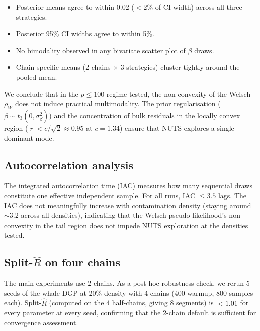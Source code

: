 \begin{itemize}
\item Posterior means agree to within $0.02$ ($< 2\%$ of CI width)
  across all three strategies.
\item Posterior 95\% CI widths agree to within 5\%.
\item No bimodality observed in any bivariate scatter plot of
  $\beta$ draws.
\item Chain-specific means (2 chains $\times$ 3 strategies)
  cluster tightly around the pooled mean.
\end{itemize}

We conclude that in the $p \le 100$ regime tested, the
non-convexity of the Welsch $\rho_W$ does not induce practical
multimodality. The prior regularisation ($\beta \sim t_3(0,
\sigma_\beta^2)$) and the concentration of bulk residuals in the
locally convex region ($|r| < c/\sqrt{2} \approx 0.95$ at
$c = 1.34$) ensure that NUTS explores a single dominant mode.

\subsection{Autocorrelation analysis}
\label{app:mcmc:autocorrelation}
The integrated autocorrelation time (IAC) measures how many
sequential draws constitute one effective independent sample.
For all runs, IAC $\le 3.5$ lags. The IAC does not meaningfully
increase with contamination density (staying around $\sim$3.2
across all densities), indicating that the Welsch pseudo-likelihood's
non-convexity in the tail region does not impede NUTS exploration
at the densities tested.

\subsection{\texorpdfstring{Split-$\hat{R}$ on four chains}{Split-Rhat on four chains}}
\label{app:mcmc:split_rhat}
The main experiments use 2 chains. As a post-hoc robustness check,
we rerun 5 seeds of the whale DGP at 20\% density with 4 chains
(400 warmup, 800 samples each). Split-$\hat{R}$ (computed on the
4 half-chains, giving 8 segments) is $< 1.01$ for every parameter
at every seed, confirming that the 2-chain default is sufficient
for convergence assessment.
